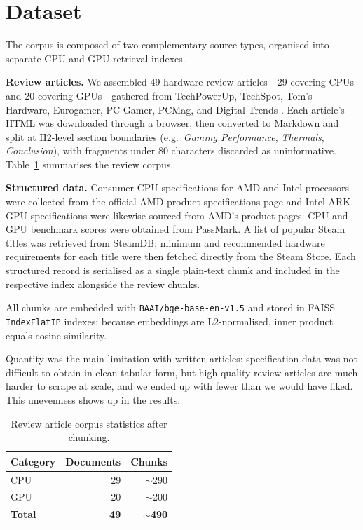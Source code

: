 \documentclass[fleqn,moreauthors,10pt]{ds_report}
\begin{document}
\section*{Dataset}

The corpus is composed of two complementary source types, organised into separate CPU and GPU retrieval indexes.

\textbf{Review articles.}
We assembled 49 hardware review articles - 29 covering CPUs and 20 covering GPUs - gathered from TechPowerUp\cite{techpowerup}, TechSpot\cite{techspot}, Tom's Hardware\cite{tomshardware}, Eurogamer\cite{eurogamer}, PC Gamer\cite{pcgamer}, PCMag\cite{pcmag}, and Digital Trends \cite{digitaltrends}. Each article's HTML was downloaded through a browser, then converted to Markdown and split at H2-level section boundaries (e.g.\ \textit{Gaming Performance}, \textit{Thermals}, \textit{Conclusion}), with fragments under 80 characters discarded as uninformative. Table~\ref{tab:dataset} summarises the review corpus.

\textbf{Structured data.}
Consumer CPU specifications for AMD and Intel processors were collected from the official AMD product specifications page\cite{amd_specifications} and Intel ARK\cite{intel_ark}. GPU specifications were likewise sourced from AMD's product pages\cite{amd_specifications}. CPU and GPU benchmark scores were obtained from PassMark\cite{passmark}. A list of popular Steam titles was retrieved from SteamDB\cite{steamdb}; minimum and recommended hardware requirements for each title were then fetched directly from the Steam Store\cite{steam_store}. Each structured record is serialised as a single plain-text chunk and included in the respective index alongside the review chunks.

All chunks are embedded with \texttt{BAAI/bge-base-en-v1.5} and stored in FAISS \texttt{IndexFlatIP} indexes; because embeddings are L2-normalised, inner product equals cosine similarity.

Quantity was the main limitation with written articles: specification data was not difficult to obtain in clean tabular form, but high-quality review articles are much harder to scrape at scale, and we ended up with fewer than we would have liked. This unevenness shows up in the results.

\begin{table}[h]
\caption{Review article corpus statistics after chunking.}
\label{tab:dataset}
\centering
\begin{tabular}{lrr}
\hline
Category & Documents & Chunks\\
\hline
CPU & 29 & $\sim$290 \\
GPU & 20 & $\sim$200 \\
\hline
\textbf{Total} & \textbf{49} & \textbf{$\sim$490} \\
\hline
\end{tabular}
\end{table}
\end{document}
